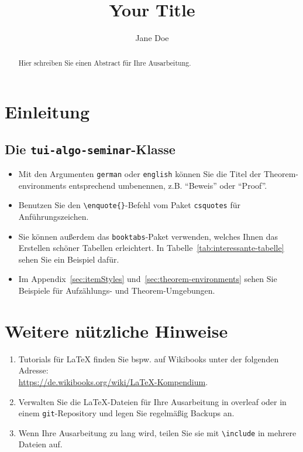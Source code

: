 \documentclass[a4paper,german]{tui-algo-seminar}
\title{Your Title}
\author{Jane Doe}
\begin{document}
\maketitle

\begin{abstract}
Hier schreiben Sie einen Abstract für Ihre Ausarbeitung.
\end{abstract}


\section{Einleitung}

\subsection{Die \texttt{tui-algo-seminar}-Klasse}

\begin{itemize}
	\item Mit den Argumenten \texttt{german} oder \texttt{english} können Sie die Titel der Theorem-environments entsprechend umbenennen, z.B. \enquote{Beweis} oder \enquote{Proof}.
  \item Benutzen Sie den \texttt{\textbackslash enquote\{\}}-Befehl vom Paket \texttt{csquotes} für Anführungszeichen.
  \item Sie können außerdem das \texttt{booktabs}-Paket verwenden,
    welches Ihnen das Erstellen schöner Tabellen erleichtert.
    In Tabelle~\ref{tab:interessante-tabelle} sehen Sie ein Beispiel dafür.
  \item Im Appendix~\ref{sec:itemStyles} und~\ref{sec:theorem-environments} sehen Sie Beispiele für Aufzählungs- und Theorem-Umgebungen.
\end{itemize}

\section{Weitere nützliche Hinweise}
\label{sec:weitere_nutzliche_hinweise}

\begin{enumerate}
  \item Tutorials für \LaTeX{} finden Sie bspw. auf Wikibooks unter der folgenden Adresse: \\ \url{https://de.wikibooks.org/wiki/LaTeX-Kompendium}.
  \item Verwalten Sie die \LaTeX-Dateien für Ihre Ausarbeitung in overleaf oder in einem \texttt{git}-Repository und legen Sie regelmäßig Backups an.
  \item Wenn Ihre Ausarbeitung zu lang wird, teilen Sie sie mit \texttt{\textbackslash include} in mehrere Dateien auf.
\end{enumerate}
\end{document}
